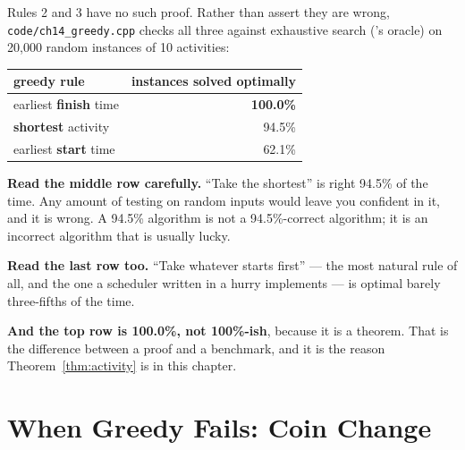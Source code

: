 \begin{worked}
Rules 2 and 3 have no such proof. Rather than assert they are wrong,
\texttt{code/ch14\_greedy.cpp} checks all three against exhaustive search
('s oracle) on 20{,}000 random instances of 10 activities:

\begin{center}
\begin{tabular}{@{}lr@{}}
\toprule
\rowcolor{primary!15}
greedy rule & instances solved optimally \\
\midrule
earliest \textbf{finish} time & \textbf{100.0\%} \\
\textbf{shortest} activity    & 94.5\% \\
earliest \textbf{start} time  & 62.1\% \\
\bottomrule
\end{tabular}
\end{center}

\smallskip
\textbf{Read the middle row carefully.} ``Take the shortest'' is right 94.5\%
of the time. Any amount of testing on random inputs would leave you confident
in it, and it is wrong. A 94.5\% algorithm is not a 94.5\%-correct algorithm;
it is an incorrect algorithm that is usually lucky.

\smallskip
\textbf{Read the last row too.} ``Take whatever starts first'' --- the most
natural rule of all, and the one a scheduler written in a hurry implements ---
is optimal barely three-fifths of the time.

\smallskip
\textbf{And the top row is 100.0\%, not 100\%-ish}, because it is a theorem.
That is the difference between a proof and a benchmark, and it is the reason
Theorem~\ref{thm:activity} is in this chapter.
\end{worked}

\section{When Greedy Fails: Coin Change}

